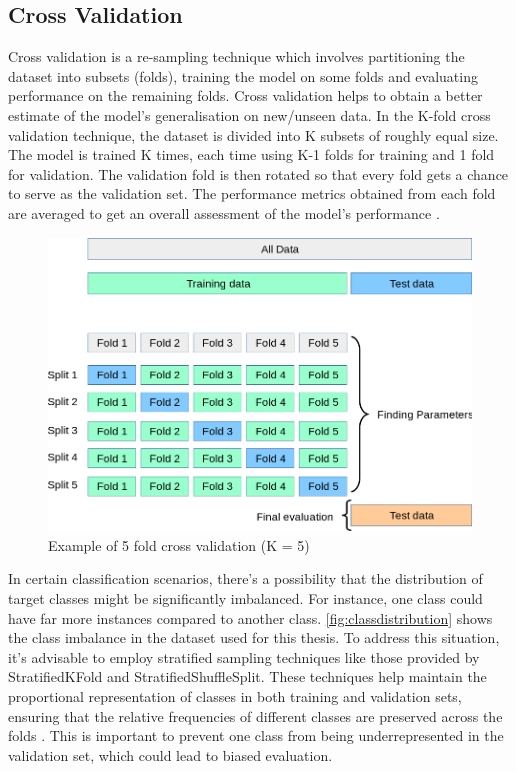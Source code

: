 \subsection{Cross Validation}
Cross validation is a re-sampling technique which involves partitioning the dataset into subsets (folds), training the model on some folds and evaluating performance on the remaining folds. Cross validation helps to obtain a better estimate of the model's generalisation on new/unseen data. In the K-fold cross validation technique, the dataset is divided into K subsets of roughly equal size. The model is trained K times, each time using K-1 folds for training and 1 fold for validation. The validation fold is then rotated so that every fold gets a chance to serve as the validation set. The performance metrics obtained from each fold are averaged to get an overall assessment of the model's performance \citep{hastie-ch7}.

\begin{figure}[H]
    \centering
    \includegraphics[scale=0.5]{images/cv.png}
    \caption{Example of 5 fold cross validation (K = 5) \citep{scikit-learn-crossval}}
    \label{fig:cv}
\end{figure}

In certain classification scenarios, there's a possibility that the distribution of target classes might be significantly imbalanced. For instance, one class could have far more instances compared to another class. \autoref{fig:classdistribution} shows the class imbalance in the dataset used for this thesis. To address this situation, it's advisable to employ stratified sampling techniques like those provided by StratifiedKFold and StratifiedShuffleSplit. These techniques help maintain the proportional representation of classes in both training and validation sets, ensuring that the relative frequencies of different classes are preserved across the folds \citep{scikit-learn-crossval}. This is important to prevent one class from being underrepresented in the validation set, which could lead to biased evaluation. 


